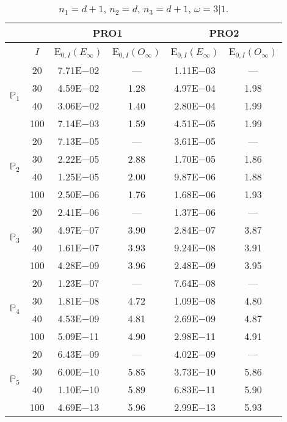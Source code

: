 \begin{table}[H]
\caption{$n_1=d+1$, $n_2=d$, $n_3=d+1$, $\omega=3|1$.}
\setlength{\tabcolsep}{5pt}
\centering
\begin{tabular}{@{}l c c c c c@{}}
\toprule
 &  & \multicolumn{2}{c}{PRO1} & \multicolumn{2}{c}{PRO2}\\
\midrule
 & $I$ & E$_{0,I}(E_{\infty})$ & E$_{0,I}(O_{\infty})$ & E$_{0,I}(E_{\infty})$ & E$_{0,I}(O_{\infty})$\\
\midrule
\multirow{4}{*}{$\mathbb{P}_{1}$}
 & 20 & 7.71E$-$02 & --- & 1.11E$-$03 & ---\\
 & 30 & 4.59E$-$02 & 1.28 & 4.97E$-$04 & 1.98 \\
 & 40 & 3.06E$-$02 & 1.40 & 2.80E$-$04 & 1.99 \\
 & 100 & 7.14E$-$03 & 1.59 & 4.51E$-$05 & 1.99 \\
\midrule
\multirow{4}{*}{$\mathbb{P}_{2}$}
 & 20 & 7.13E$-$05 & --- & 3.61E$-$05 & ---\\
 & 30 & 2.22E$-$05 & 2.88 & 1.70E$-$05 & 1.86 \\
 & 40 & 1.25E$-$05 & 2.00 & 9.87E$-$06 & 1.88 \\
 & 100 & 2.50E$-$06 & 1.76 & 1.68E$-$06 & 1.93 \\
\midrule
\multirow{4}{*}{$\mathbb{P}_{3}$}
 & 20 & 2.41E$-$06 & --- & 1.37E$-$06 & ---\\
 & 30 & 4.97E$-$07 & 3.90 & 2.84E$-$07 & 3.87 \\
 & 40 & 1.61E$-$07 & 3.93 & 9.24E$-$08 & 3.91 \\
 & 100 & 4.28E$-$09 & 3.96 & 2.48E$-$09 & 3.95 \\
\midrule
\multirow{4}{*}{$\mathbb{P}_{4}$}
 & 20 & 1.23E$-$07 & --- & 7.64E$-$08 & ---\\
 & 30 & 1.81E$-$08 & 4.72 & 1.09E$-$08 & 4.80 \\
 & 40 & 4.53E$-$09 & 4.81 & 2.69E$-$09 & 4.87 \\
 & 100 & 5.09E$-$11 & 4.90 & 2.98E$-$11 & 4.91 \\
\midrule
\multirow{4}{*}{$\mathbb{P}_{5}$}
 & 20 & 6.43E$-$09 & --- & 4.02E$-$09 & ---\\
 & 30 & 6.00E$-$10 & 5.85 & 3.73E$-$10 & 5.86 \\
 & 40 & 1.10E$-$10 & 5.89 & 6.83E$-$11 & 5.90 \\
 & 100 & 4.69E$-$13 & 5.96 & 2.99E$-$13 & 5.93 \\
\bottomrule
\end{tabular}
\label{Table:PRO:Rodrigo:Test6}
\end{table}
